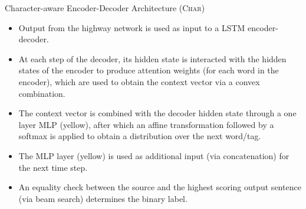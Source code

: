 \documentclass[final]{beamer}
\newlength{\twocolwid}
\begin{document}
\begin{frame}[t]
\begin{columns}[t]
\begin{column}{\twocolwid}
\begin{alertblock}{Character-aware Encoder-Decoder Architecture (\textsc{Char})}
{\begin{itemize}
                    \item Output from the highway network is used as input to a LSTM encoder-decoder. 
                    \item At each step of the decoder, its hidden state is interacted with the hidden states of the encoder to produce attention weights (for each word in the encoder), which are
                                    used to obtain the context vector via a convex combination. 
                    \item The context vector is combined with the decoder hidden state through a one layer MLP (yellow), after which an affine 
                                    transformation followed by a softmax is applied to obtain a distribution over the next word/tag.
                    \item The MLP layer (yellow) is used as additional input (via concatenation) for the next time step.
                    \item An equality check between the source and the highest scoring output sentence (via beam search) determines the binary label.
                \end{itemize}}
            \end{alertblock}
        \end{column}
  

\end{columns}
\end{frame}
\end{document}
